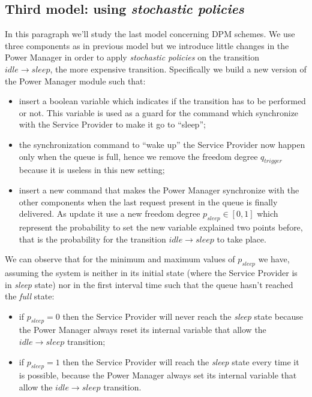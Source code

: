 \subsection{Third model: using \emph{stochastic policies}}

In this paragraph we'll study the last model concerning DPM
schemes. We use three components as in previous model but we introduce
little changes in the Power Manager in order to apply \emph{stochastic
  policies} on the transition $idle \rightarrow sleep$, the more
expensive transition. Specifically we build a new version of the Power
Manager module such that:
\begin{itemize}
\item insert a boolean variable which indicates if the transition has
  to be performed or not. This variable is used as a guard for the
  command which synchronize with the Service Provider to make it go to
  ``sleep'';
\item the synchronization command to ``wake up'' the Service Provider
  now happen only when the queue is full, hence we remove the freedom
  degree $q_{trigger}$ because it is useless in this new setting;
\item insert a new command that makes the Power Manager synchronize
  with the other components when the last request present in the queue
  is finally delivered. As update it use a new freedom degree
  $p_{sleep} \in [0,1]$ which represent the probability to set the new
  variable explained two points before, that is the probability for
  the transition $idle \rightarrow sleep$ to take place.
\end{itemize}

We can observe that for the minimum and maximum values of $p_{sleep}$
we have, assuming the system is neither in its initial state (where
the Service Provider is in \emph{sleep} state) nor in the first
interval time such that the queue hasn't reached the \emph{full}
state:
\begin{itemize}
\item if $p_{sleep} = 0$ then the Service Provider will never reach
  the \emph{sleep} state because the Power Manager always reset its
  internal variable that allow the $idle \rightarrow sleep$ transition;
\item if $p_{sleep} = 1$ then the Service Provider will reach the
  \emph{sleep} state every time it is possible, because the Power
  Manager always set its internal variable that allow the $idle
  \rightarrow sleep$ transition.
\end{itemize}

